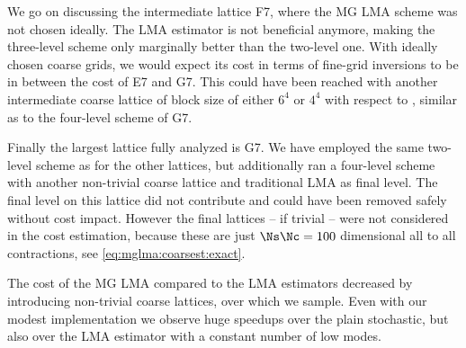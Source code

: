 We go on discussing the intermediate lattice F7, where the MG LMA scheme was not chosen ideally.
The LMA estimator is not beneficial anymore, making the three-level scheme only marginally better than the two-level one.
With ideally chosen coarse grids, we would expect its cost in terms of fine-grid inversions to be in between the cost of E7 and G7.
This could have been reached with another intermediate coarse lattice of block size of either $6^4$ or $4^4$ with respect to , similar as to the four-level scheme of G7.

Finally the largest lattice fully analyzed is G7.
We have employed the same two-level scheme as for the other lattices, but additionally ran a four-level scheme with another non-trivial coarse lattice and traditional LMA as final level.
The final level on this lattice did not contribute and could have been removed safely without cost impact.
However the final lattices -- if trivial -- were not considered in the cost estimation, because these are just $\Ns \Nc=100$ dimensional all to all contractions, see \cref{eq:mglma:coarsest:exact}.

The cost of the MG LMA compared to the LMA estimators decreased by introducing non-trivial coarse lattices, over which we sample.
Even with our modest implementation we observe huge speedups over the plain stochastic, but also over the LMA estimator with a constant number of low modes.

